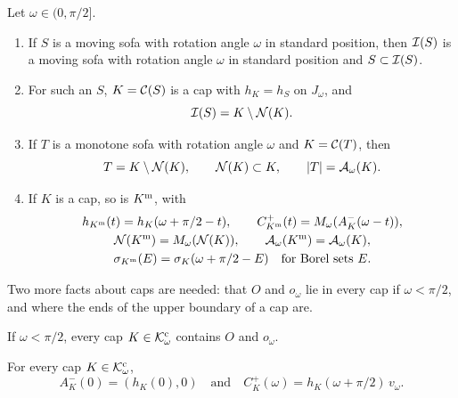 \begin{fact}\label{fact:monotone}
Let $\omega\in(0,\pi/2]$.
\begin{enumerate}[label=(\alph*)]
\item\label{fact:monotone:envelope} If $S$ is a moving sofa with rotation angle
$\omega$ in standard position, then $\mathcal{I}(S)$ is a moving sofa with rotation
angle $\omega$ in standard position and $S\subset\mathcal{I}(S)$. 
\item\label{fact:monotone:cap} For such an $S$, $K=\mathcal{C}(S)$ is a cap with
$h_K=h_S$ on $J_\omega$, and
\[
  \mathcal{I}(S)=K\setminus\mathcal{N}(K).
\]
\item\label{fact:monotone:area} If $T$ is a monotone sofa with rotation angle
$\omega$ and $K=\mathcal{C}(T)$, then
\[
  T=K\setminus\mathcal{N}(K),\qquad \mathcal{N}(K)\subset K,\qquad \lvert T\rvert=\mathcal{A}_\omega(K).
\]
\item\label{fact:monotone:mirror} If $K$ is a cap, so is $K^{\mathrm{m}}$, with
\begin{gather*}
  h_{K^{\mathrm{m}}}(t)=h_K(\omega+\pi/2-t),\qquad
  C^+_{K^{\mathrm{m}}}(t)=M_\omega(A^-_K(\omega-t)),\\
  \mathcal{N}(K^{\mathrm{m}})=M_\omega(\mathcal{N}(K)),\qquad \mathcal{A}_\omega(K^{\mathrm{m}})=\mathcal{A}_\omega(K),\\
  \sigma_{K^{\mathrm{m}}}(E)=\sigma_K(\omega+\pi/2-E)\quad\text{for Borel sets }E.
\end{gather*}
\end{enumerate}
\end{fact}

Two more facts about caps are needed: that $O$ and $o_\omega$ lie in every cap
if $\omega<\pi/2$, and where the ends of the upper boundary of a cap are.

\begin{lemma}\label{lem:contains}
If $\omega<\pi/2$, every cap $K\in\mathcal{K}^{\mathrm{c}}_\omega$ contains $O$ and $o_\omega$.
\end{lemma}

\begin{lemma}\label{lem:ends}
For every cap $K\in\mathcal{K}^{\mathrm{c}}_\omega$,
\begin{equation}\label{eq:ends}
  A_K^-(0)=(h_K(0),0)\quad\text{and}\quad C_K^+(\omega)=h_K(\omega
    +\pi/2)\,v_\omega .
\end{equation}
\end{lemma}

